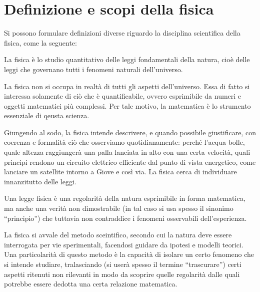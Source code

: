 \marginpar{\minitoc}

\section{Definizione e scopi della fisica}

Si possono formulare definizioni diverse riguardo la disciplina scientifica
della fisica, come la seguente:

\begin{tcolorbox}[colback = yellow!30, colframe = yellow!30!black, title = {Fisica}]
La fisica è lo studio quantitativo delle leggi fondamentali della natura, cioè
delle leggi che governano tutti i fenomeni naturali dell'universo.
\end{tcolorbox}

\noindent La fisica non si occupa in realtà di tutti gli aspetti dell'universo.
Essa di fatto si interessa solamente di ciò che è quantificabile, ovvero
esprimibile da numeri e oggetti matematici più complessi. Per tale motivo,
la matematica è lo strumento essenziale di qeusta scienza.

Giungendo al sodo, la fisica intende descrivere, e quando possibile giustificare,
con coerenza e formalità ciò che osserviamo quotidianamente: perché l'acqua
bolle, quale altezza raggiungerà una palla lanciata in alto con una certa
velocità, quali principi rendono un circuito elettrico efficiente dal punto
di vista energetico, come lanciare un satellite intorno a Giove e così via. La
fisica cerca di individuare innanzitutto delle leggi.

\begin{tcolorbox}[colback = yellow!30, colframe = yellow!30!black, title = {Legge}]
    Una legge fisica è una regolarità della natura esprimibile in forma
    matematica, ma anche una verità non dimostrabile (in tal caso si usa spesso il
    sinonimo ``principio'') che tuttavia non contraddice i
    fenomeni osservabili dell'esperienza.
\end{tcolorbox}

\noindent La fisica si avvale del metodo sceintifico, secondo cui la natura deve
essere interrogata per vie sperimentali, facendosi guidare da ipotesi e
modelli teorici. Una particolarità di questo metodo è la capacità di isolare
un certo fenomeno che si intende studiare, tralasciando (si userà spesso il
termine ``trascurare'') certi aspetti ritenuti non rilevanti in modo da
scoprire quelle regolarità dalle quali potrebbe essere dedotta una certa
relazione matematica.

